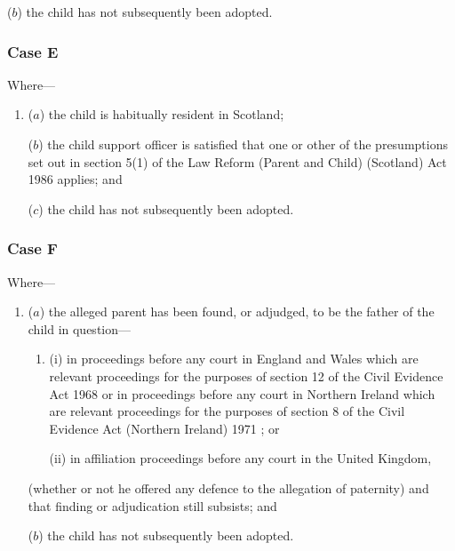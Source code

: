 \documentclass[12pt,a4paper]{article}
\begin{document}
\begin{enumerate}
\begin{enumerate}
    ($b$) 
    the child has not subsequently been adopted.
\end{enumerate}

    \subsubsection*{Case E}

    Where—
\begin{enumerate}\item[]
    ($a$) 
    the child is habitually resident in Scotland;

    ($b$) 
    the child support officer 
is satisfied that one or other of the presumptions set out in section 5(1)  of the Law Reform (Parent and Child) (Scotland) Act 1986 applies; and

    ($c$) 
    the child has not subsequently been adopted.
\end{enumerate}

    \subsubsection*{Case F}

    Where—
\begin{enumerate}\item[]
    ($a$) 
    the alleged parent has been found, or adjudged, to be the father of the child in question—
\begin{enumerate}\item[]
    (i) 
    in proceedings before any court in England and Wales which are relevant proceedings for the purposes of section 12 of the Civil Evidence Act 1968
or in proceedings before any court in Northern Ireland which are relevant proceedings for the purposes of section 8 of the Civil Evidence Act (Northern Ireland) 1971%
; or

    (ii) 
    in affiliation proceedings before any court in the United Kingdom,
\end{enumerate}

    (whether or not he offered any defence to the allegation of paternity) and that finding or adjudication still subsists; and

    ($b$) 
    the child has not subsequently been adopted. 
\end{enumerate}
\end{enumerate}
\end{document}
